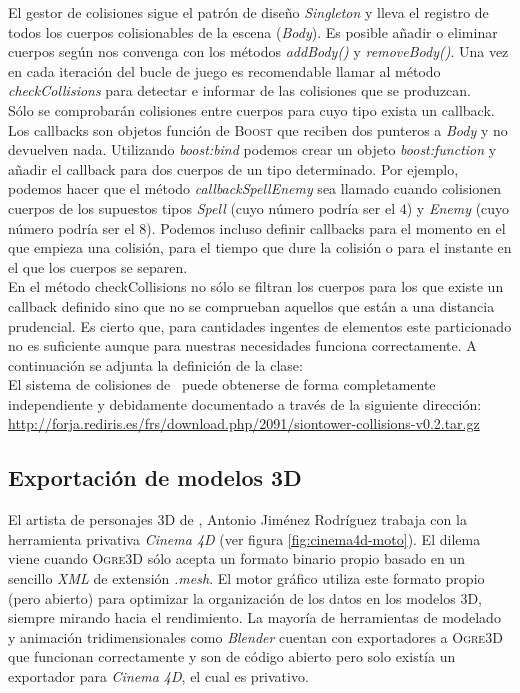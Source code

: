 El gestor de colisiones sigue el patrón de diseño \textit{Singleton} \cite{gamm77}
y lleva el registro de todos los cuerpos colisionables de la escena (\textit{Body}).
Es posible añadir o eliminar cuerpos según nos convenga con los métodos
\textit{addBody()} y \textit{removeBody()}.
Una vez en cada iteración del bucle de juego es recomendable llamar al método
\textit{checkCollisions} para detectar e informar de las colisiones que se
produzcan.\\

Sólo se comprobarán colisiones entre cuerpos para cuyo tipo exista un
callback. Los callbacks son objetos función de \textsc{Boost} que reciben
dos punteros a \textit{Body} y no devuelven nada. Utilizando \textit{boost:bind}
podemos crear un objeto \textit{boost:function} y añadir el callback para dos
cuerpos de un tipo determinado. Por ejemplo, podemos hacer que el método
\textit{callbackSpellEnemy} sea llamado cuando colisionen cuerpos de los
supuestos tipos \textit{Spell} (cuyo número podría ser el 4) y \textit{Enemy}
(cuyo número podría ser el 8). Podemos incluso definir callbacks para el momento
en el que empieza una colisión, para el tiempo que dure la colisión o para el
instante en el que los cuerpos se separen.\\

En el método checkCollisions no sólo se filtran los cuerpos para los que
existe un callback definido sino que no se comprueban aquellos que están
a una distancia prudencial. Es cierto que, para cantidades ingentes de
elementos este particionado no es suficiente aunque para nuestras necesidades
funciona correctamente. A continuación se adjunta la definición de la clase:\\



El sistema de colisiones de \juego\ puede obtenerse de forma completamente
independiente y debidamente documentado a través de la siguiente dirección:\\

\url{http://forja.rediris.es/frs/download.php/2091/siontower-collisions-v0.2.tar.gz}\\


\subsection{Exportación de modelos 3D}

El artista de personajes 3D de \juego, Antonio Jiménez Rodríguez trabaja
con la herramienta privativa \textit{Cinema 4D} \cite{website:cinema4d}
(ver figura \ref{fig:cinema4d-moto}).
El dilema viene cuando \textsc{Ogre3D} sólo acepta un formato binario propio
basado en un sencillo \textit{XML} de extensión \textit{.mesh}. El motor
gráfico utiliza este formato propio (pero abierto) para optimizar la organización
de los datos en los modelos 3D, siempre mirando hacia el rendimiento. La mayoría
de herramientas de modelado y animación tridimensionales como \textit{Blender}
cuentan con exportadores a \textsc{Ogre3D} que funcionan correctamente y
son de código abierto pero solo existía un exportador para \textit{Cinema 4D}, 
el cual es privativo.\\

